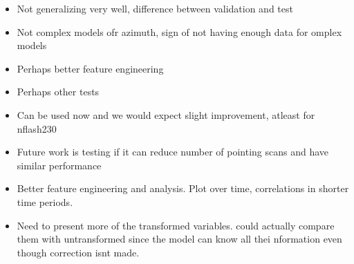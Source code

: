 \begin{itemize}
    \item Not generalizing very well, difference between validation and test
    \item Not complex models ofr azimuth, sign of not having enough data for omplex models
    \item Perhaps better feature engineering
    \item Perhaps other tests
    \item Can be used now and we would expect slight improvement, atleast for nflash230
    \item Future work is testing if it can reduce number of pointing scans and have similar performance
    \item Better feature engineering and analysis.
    Plot over time, correlations in shorter time periods.
    \item Need to present more of the transformed variables. could actually compare them with untransformed since the model can know all thei nformation even though correction isnt made.
\end{itemize}

